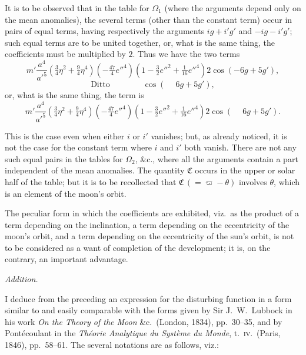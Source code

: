 \documentclass[12pt,a4paper]{article}
\theoremstyle{plain}
\begin{document}
It is to be observed that in the table for $\Omega_{1}$ (where the arguments depend only on the mean anomalies), the several terms (other than the constant term) occur in pairs of equal terms, having respectively the arguments $ig+i'g'$ and $-ig-i'g'$; such equal terms are to be united together, or, what is the same thing, the coefficients must be multiplied by $2$. Thus we have the two terms
\[
m'\frac{a^{4}}{a'^{5}}(\tfrac{3}{4}\eta^{2}+\tfrac{9}{4}\eta^{4})(-\tfrac{47}{4}e''^{4})(1-\tfrac{3}{2}e''^{2}+\tfrac{1}{16}e''^{4})2\cos(-6g+5g'),
\]
\[
\text{Ditto}\qquad\qquad\cos(\phantom{-}6g+5g'),
\]
or, what is the same thing, the term is
\[
m'\frac{a^{4}}{a'^{5}}(\tfrac{3}{4}\eta^{2}+\tfrac{9}{4}\eta^{4})(-\tfrac{47}{4}e''^{4})(1-\tfrac{3}{2}e''^{2}+\tfrac{1}{16}e''^{4})2\cos(\phantom{-}6g+5g').
\]

This is the case even when either $i$ or $i'$ vanishes; but, as already noticed, it is not the case for the constant term where $i$ and $i'$ both vanish. There are not any such equal pairs in the tables for $\Omega_{2}$, \&c., where all the arguments contain a part independent of the mean anomalies. The quantity $\mathfrak{C}$ occurs in the upper or solar half of the table; but it is to be recollected that $\mathfrak{C}\,(=\varpi-\theta)$ involves $\theta$, which is an element of the moon's orbit.

\medskip

The peculiar form in which the coefficients are exhibited, viz.\ as the product of a term depending on the inclination, a term depending on the eccentricity of the moon's orbit, and a term depending on the eccentricity of the sun's orbit, is not to be considered as a want of completion of the development; it is, on the contrary, an important advantage.

\medskip


\bigskip

\begin{center}
\textit{Addition.}
\end{center}

I deduce from the preceding an expression for the disturbing function in a form similar to and easily comparable with the forms given by Sir J.~W.~Lubbock in his work \textit{On the Theory of the Moon} \&c.\ (London, 1834), pp.~30--35, and by Pont\'ecoulant in the \textit{Th\'eorie Analytique du Syst\`eme du Monde}, t.~\textsc{iv}.\ (Paris, 1846), pp.~58--61. The several notations are as follows, viz.:
\end{document}
